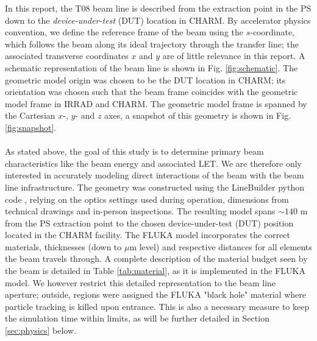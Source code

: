 In this report, the T08 beam line is described from the extraction point in the PS down to the \emph{device-under-test} (DUT) location in CHARM. By accelerator physics convention, we define the reference frame of the beam using the $s$-coordinate, which follows the beam along its ideal trajectory through the transfer line; the associated transverse coordinates $x$ and $y$ are of little relevance in this report. A schematic representation of the beam line is shown in Fig. \ref{fig:schematic}. The geometric model origin was chosen to be the DUT location in CHARM; its orientation was chosen such that the beam frame coincides with the geometric model frame in IRRAD and CHARM. The geometric model frame is spanned by the Cartesian $x$-, $y$- and $z$ axes, a snapshot of this geometry is shown in Fig. \ref{fig:snapshot}. \\
\\
As stated above, the goal of this study is to determine primary beam characteristics like the beam energy and associated LET. We are therefore only interested in accurately modeling direct interactions of the beam with the beam line infrastructure. The geometry was constructed using the LineBuilder python code \cite{Mereghetti12}, relying on the optics settings used during operation, dimensions from technical drawings and in-person inspections. The resulting model spans $\sim 140$ m from the PS extraction point to the chosen device-under-test (DUT) position located in the CHARM facility. The FLUKA model incorporates the correct materials, thicknesses (down to $\mu$m level) and respective distances for all elements the beam travels through. A complete description of the material budget seen by the beam is detailed in Table \ref{tab:material}, as it is implemented in the FLUKA model. We however restrict this detailed representation to the beam line aperture; outside, regions were assigned the FLUKA "black hole" material where particle tracking is killed upon entrance. This is also a necessary measure to keep the simulation time within limits, as will be further detailed in Section \ref{sec:physics} below.

